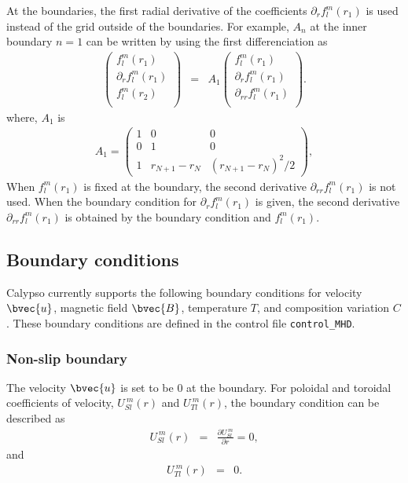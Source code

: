 At the boundaries, the first radial derivative of the coefficients $\partial_{r} f_{l}^{m}(r_{1})$ is used  instead of the grid outside of the boundaries. For example, $A_{n}$ at the inner boundary $n = 1$ can be written by using the first differenciation as 
%
\begin{eqnarray}
\left( \begin{array}{c}
f_{l}^{m}(r_{1}) \\
\partial_{r} f_{l}^{m}(r_{1}) \\
f_{l}^{m}(r_{2}) \\
\end{array} \right)
 & = & 
A_{1}
\left( \begin{array}{c}
f_{l}^{m}(r_{1}) \\
\partial_r  f_{l}^{m}(r_{1}) \\
\partial_{rr} f_{l}^{m}(r_{1}) \\
\end{array} \right).
\end{eqnarray}
%
where, $A_{1}$ is
%
\begin{eqnarray}
A_{1} = 
\left( \begin{array}{ccc}
1 & 0 & 0  \\
0 & 1 & 0  \\
1 & r_{N+1} - r_{N} & \left(r_{N+1} - r_{N} \right)^2 / 2
\end{array} \right),
\end{eqnarray}
%
When $f_{l}^{m}(r_{1})$ is fixed at the boundary, the second derivative $\partial_{rr} f_{l}^{m}(r_{1})$ is not used. When the boundary condition for $\partial_r  f_{l}^{m}(r_{1})$ is given, the second derivative  $\partial_{rr} f_{l}^{m}(r_{1})$ is obtained by the boundary condition and $f_{l}^{m}(r_{1})$.

\subsection{Boundary conditions}
Calypso currently supports the following boundary conditions for velocity $\bvec{u}$, magnetic field $\bvec{B}$, temperature $T$, and composition variation $C$. These boundary conditions are defined in the control file \verb|control_MHD|.

\subsubsection{Non-slip boundary}
The velocity $\bvec{u}$ is set to be 0 at the boundary. For poloidal and toroidal coefficients of velocity, $U_{Sl}^{\ m}(r)$ and $U_{Tl}^{\ m}(r)$, the boundary condition can be described as
%
\begin{eqnarray}
U_{Sl}^{\ m}(r) & = & \frac{\partial U_{Sl}^{\ m}}{\partial r} = 0,
\nonumber
\end{eqnarray}
%
and 
%
\begin{eqnarray}
U_{Tl}^{\ m}(r) & = & 0.
\nonumber
\end{eqnarray}
%
